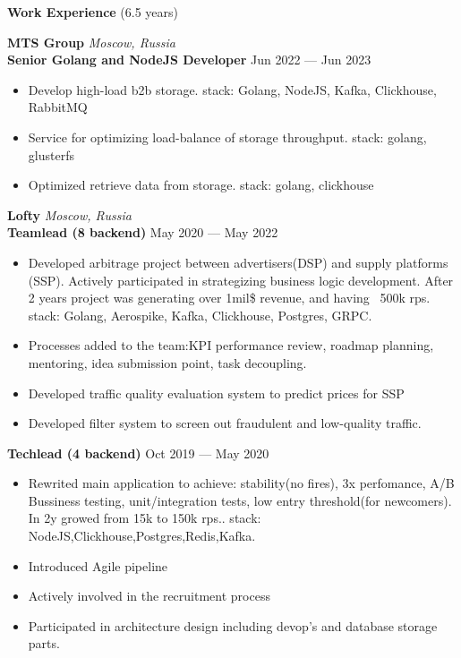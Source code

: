 \documentclass{resume} %
\begin{document}
\begin{rSection}{\textbf{Work Experience} (6.5 years) }

\textbf{MTS Group} \hfill \textit{Moscow, Russia} \\
\textbf{Senior Golang and NodeJS Developer}  \hfill Jun 2022 --- Jun 2023
\begin{itemize}
    \setlength\itemsep{-0.3em}
    \item Develop high-load b2b storage. stack: Golang, NodeJS, Kafka, Clickhouse, RabbitMQ
    \item Service for optimizing load-balance of storage throughput. stack: golang, glusterfs
    \item Optimized retrieve data from storage. stack: golang, clickhouse
\end{itemize}

\textbf{Lofty} \hfill \textit{Moscow, Russia} \\
\textbf{Teamlead (8 backend)} \hfill May 2020 --- May 2022
\begin{itemize}
    \setlength\itemsep{-0.3em}
    \item Developed arbitrage project between advertisers(DSP) and supply platforms (SSP). Actively participated in strategizing
    	   business logic development. After 2 years project was generating over 1mil\$ revenue, and having ~500k rps.
	    \\ stack: Golang, Aerospike, Kafka, Clickhouse, Postgres, GRPC.
    \item Processes added to the team:KPI performance review, roadmap planning, mentoring, idea submission point, task decoupling.
    \item Developed traffic quality evaluation system to predict prices for SSP
    \item Developed filter system to screen out fraudulent and low-quality traffic.
\end{itemize}

\textbf{Techlead (4 backend)} \hfill Oct 2019 --- May 2020
\begin{itemize}
    \setlength\itemsep{-0.3em}
    \item Rewrited main application to achieve: stability(no fires), 3x perfomance, A/B Bussiness testing, unit/integration tests, low
    	    entry threshold(for newcomers). In 2y growed from 15k to 150k rps.. stack: NodeJS,Clickhouse,Postgres,Redis,Kafka.
    \item Introduced Agile pipeline
    \item Actively involved in the recruitment process
    \item Participated in architecture design including devop's and database storage parts.
\end{itemize}


\end{rSection}
\end{document}
